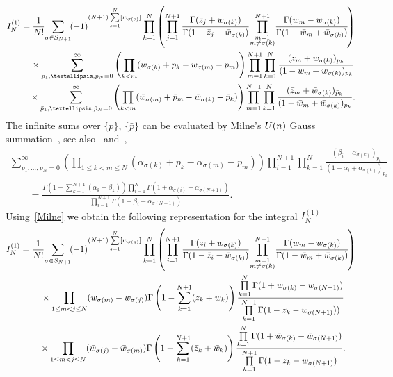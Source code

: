 \documentclass[11pt]{article}
\numberwithin{equation}{section}
\numberwithin{equation}{section}
\begin{document}
\begin{gather*}
I_N^{(1)}
=\frac1{N!}\!\sum_{\sigma\in S_{N+1}}\! (-1)^{(N+1)\sum\limits_{s=1}^N
[w_{\sigma(s)}]}\prod_{k=1}^{N}\left(
\prod_{j=1}^{N+1}\frac{\Gamma(z_j+w_{\sigma(k)})}{\Gamma(1-\bar z_j-\bar w_{\sigma(k)})}
\!\prod_{\substack{m=1\\ m\neq \sigma(k)}}^{N+1}\!
 \frac{ \Gamma(w_m-w_{\sigma(k)})}{\Gamma(1-\bar w_m+\bar w_{\sigma(k)})}\!\right)
\\
\hphantom{I_N^{(1)} =}{}
\times
\sum_{p_1,\ldots,p_N= 0}^\infty
 \left(\prod_{k<m} (w_{\sigma(k)}+p_k-w_{\sigma(m)}-p_m)\right)\prod_{m=1}^{N+1} \prod_{k=1}^{N}
\frac{(z_m+w_{\sigma(k)})_{p_k}}{(1-w_m+w_{\sigma(k)})_{p_k}}
\notag\\
\hphantom{I_N^{(1)} =}{}
\times
\sum_{\bar p_1,\ldots,\bar p_N=0}^\infty
 \left(\prod_{k<m} (\bar w_{\sigma(m)}+\bar p_m-\bar w_{\sigma(k)}-\bar p_k)\right)
\prod_{m=1}^{N+1} \prod_{k=1}^{N}
\frac{(\bar z_m+\bar w_{\sigma(k)})_{\bar p_k}}{(1-\bar w_m+\bar w_{\sigma(k)})_{\bar p_k}} .
\end{gather*}
The infinite sums over $\{ p\}$, $\{\bar p\}$ can be evaluated by Milne's ${\rm U}(n)$ Gauss
summation~\cite{MILNE198859}, see also~\cite[equation~(5.8)]{Gustafson94} and~\cite{Schlosser},
\begin{gather}
\sum_{p_1,\ldots,p_N = 0}^\infty \left(\prod_{1\leq k<m\leq N} (\alpha_{\sigma(k)}+p_k-\alpha_{\sigma(m)}-p_m)\right)
\prod_{i=1}^{N+1} \prod_{k=1}^{N}\frac{(\beta_i+\alpha_{\sigma(k)})_{p_k}}{(1-\alpha_i+\alpha_{\sigma(k)})_{p_k}}\nonumber\\
 \qquad{}=\frac{\Gamma\left(1-\sum\limits_{k=1}^{N+1}(\alpha_k+\beta_k)\right)
\prod\limits_{i=1}^{N}\Gamma(1+\alpha_{\sigma(i)}-\alpha_{\sigma(N+1)})}
{\prod\limits_{i=1}^{N+1}\Gamma(1-\beta_i-\alpha_{\sigma(N+1)})}.\label{Milne}
\end{gather}
Using~\eqref{Milne} we obtain the following representation for the integral $I_N^{(1)}$
\begin{gather*}
I_N^{(1)} =\frac1{N!}\!\sum_{\sigma\in S_{N+1}} \!(-1)^{(N+1)\sum\limits_{s=1}^N
[w_{\sigma(s)}] }\prod_{k=1}^{N}\left(
\prod_{i=1}^{N+1}\frac{\Gamma(z_i+w_{\sigma(k)})}{\Gamma(1-\bar z_i-\bar w_{\sigma(k)})}
\!\prod_{\substack{m=1\\ m\neq \sigma(k)}}^{N+1}\!
 \frac{ \Gamma(w_m-w_{\sigma(k)})}{\Gamma(1-\bar w_m+\bar w_{\sigma(k)})}\!\right)\\
\hphantom{I_N^{(1)} =}{} \times
\prod_{1\leq m<j\leq N} (w_{\sigma(m)}-w_{\sigma(j)})
\Gamma\left(1-\sum_{k=1}^{N+1}(z_k+w_k)\right)
\frac{\prod\limits_{k=1}^{N}\Gamma(1+w_{\sigma(k)}-w_{\sigma(N+1)})}
{\prod\limits_{k=1}^{N+1} \Gamma(1-z_k-w_{\sigma(N+1)}))}\\
\hphantom{I_N^{(1)} =}{} \times \prod_{1\leq m<j\leq N}
(\bar w_{\sigma(j)}-\bar w_{\sigma(m)})
\Gamma\left(1-\sum_{k=1}^{N+1}(\bar z_k+\bar w_k)\right)
\frac{\prod\limits_{k=1}^{N}
\Gamma(1+\bar w_{\sigma(k)}-\bar w_{\sigma(N+1)})}{
\prod\limits_{k=1}^{N+1}
\Gamma(1-\bar z_k-\bar w_{\sigma(N+1)})}.
\end{gather*}
\end{document}
